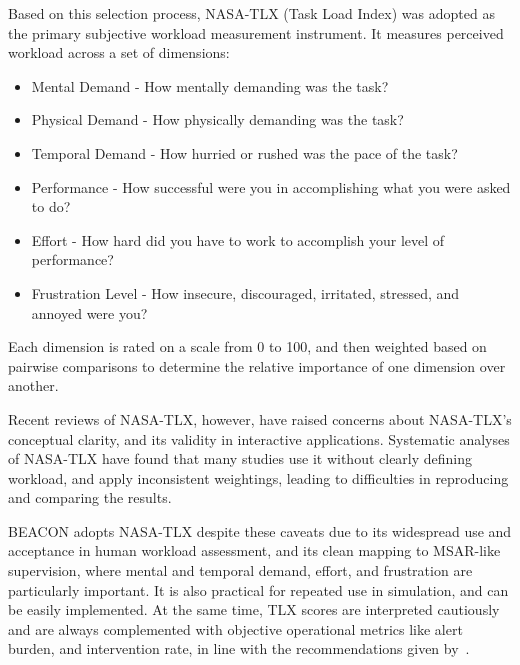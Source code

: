 Based on this selection process, NASA-TLX (Task Load Index) was adopted as the primary subjective workload measurement instrument.
It measures perceived workload across a set of dimensions:

\begin{itemize}
    \item Mental Demand - How mentally demanding was the task?
    \item Physical Demand - How physically demanding was the task?
    \item Temporal Demand - How hurried or rushed was the pace of the task?
    \item Performance - How successful were you in accomplishing what you were asked to do?
    \item Effort - How hard did you have to work to accomplish your level of performance?
    \item Frustration Level - How insecure, discouraged, irritated, stressed, and annoyed were you?
\end{itemize}

Each dimension is rated on a scale from 0 to 100, and then weighted based on pairwise comparisons to determine the relative importance of one dimension over another.

Recent reviews of NASA-TLX, however, have raised concerns about NASA-TLX's conceptual clarity, and its validity in interactive applications.
Systematic analyses of NASA-TLX have found that many studies use it without clearly defining workload, and apply inconsistent weightings, leading to difficulties in reproducing and comparing the results.

BEACON adopts NASA-TLX despite these caveats due to its widespread use and acceptance in human workload assessment, and its clean mapping to MSAR-like supervision, where mental and temporal demand, effort, and frustration are particularly important.
It is also practical for repeated use in simulation, and can be easily implemented.
At the same time, TLX scores are interpreted cautiously and are always complemented with objective operational metrics like alert burden, and intervention rate, in line with the recommendations given by~\cite{BABAEI2025103515}.
